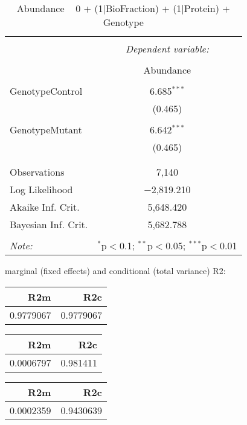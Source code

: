 \documentclass[11pt]{report}
\begin{document}
\begin{table}[!htbp] \centering 
  \caption{Abundance ~ 0 + (1|BioFraction) + (1|Protein) + Genotype} 
  \label{} 
\begin{tabular}{@{\extracolsep{5pt}}lc} 
\\[-1.8ex]\hline 
\hline \\[-1.8ex] 
 & \multicolumn{1}{c}{\textit{Dependent variable:}} \\ 
\cline{2-2} 
\\[-1.8ex] & Abundance \\ 
\hline \\[-1.8ex] 
 GenotypeControl & 6.685$^{***}$ \\ 
  & (0.465) \\ 
  & \\ 
 GenotypeMutant & 6.642$^{***}$ \\ 
  & (0.465) \\ 
  & \\ 
\hline \\[-1.8ex] 
Observations & 7,140 \\ 
Log Likelihood & $-$2,819.210 \\ 
Akaike Inf. Crit. & 5,648.420 \\ 
Bayesian Inf. Crit. & 5,682.788 \\ 
\hline 
\hline \\[-1.8ex] 
\textit{Note:}  & \multicolumn{1}{r}{$^{*}$p$<$0.1; $^{**}$p$<$0.05; $^{***}$p$<$0.01} \\ 
\end{tabular} 
\end{table} 
marginal (fixed effects) and conditional (total variance) R2:

\begin{tabular}{r|r}
\hline
R2m & R2c\\
\hline
0.9779067 & 0.9779067\\
\hline
\end{tabular}

\begin{tabular}{r|r}
\hline
R2m & R2c\\
\hline
0.0006797 & 0.981411\\
\hline
\end{tabular}

\begin{tabular}{r|r}
\hline
R2m & R2c\\
\hline
0.0002359 & 0.9430639\\
\hline
\end{tabular}
\end{document}
